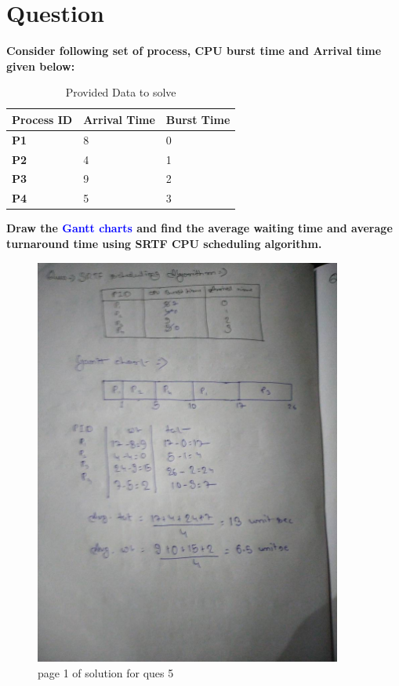 \documentclass[11pt,a4paper,oneside]{article}
\begin{document}
\clearpage

\section{Question}
\bgroup \bfseries
\noindent Consider following set of process, CPU burst time and Arrival time given below:
\egroup{}

\begin{center}
	\begin{table}[h]
		\begin{tabular}{ ||>{\bfseries} m{7em} || m{10em} || m{12em} ||}
			\hline
			Process ID & \textbf{Arrival Time} & \textbf{Burst Time} \\
			\hline
			P1 & 8 & 0 \\
			\hline
			P2 & 4 & 1 \\
			\hline
			P3 & 9 & 2 \\
			\hline
			P4 & 5 & 3 \\
			\hline
		\end{tabular}
		\caption{Provided Data to solve}
	\end{table}
\end{center}

\bgroup \bfseries
Draw the \textcolor{blue}{Gantt charts} and find the average waiting time and average turnaround time using SRTF CPU scheduling algorithm.
\egroup{}

\begin{figure}[hbt!]
	\centering
	\includegraphics[width=0.9\textwidth, angle=-90]{images/red_images/q5i1.jpg}
	\caption{page 1 of solution for ques 5}
\end{figure}
\end{document}

